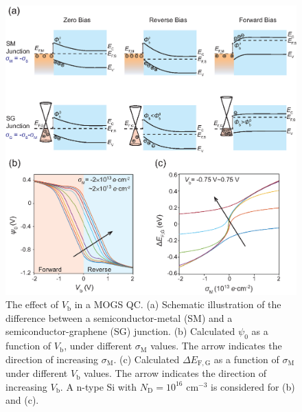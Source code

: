 \documentclass[journal=nalefd]{achemso}
\newcommand*\subs[1]{_{\text{#1}}} %
\begin{document}
\begin{figure}[htbp]
  \centering
  \includegraphics[width=0.95\linewidth]{img/FIG6.eps} %
  \caption{
  The effect of $V\subs{b}$ in a MOGS QC. (a) Schematic illustration of the difference between a semiconductor-metal (SM) and a semiconductor-graphene (SG) junction.
  (b) Calculated $\psi_0$ as a function of $V\subs{b}$, under different $\sigma\subs{M}$ values. The  arrow indicates  the  direction  of increasing $\sigma\subs{M}$.
  (c) Calculated $\Delta E_{\mathrm{F,G}}$ as a function of $\sigma\subs{M}$ under different $V\subs{b}$ values. The  arrow indicates  the  direction  of increasing $V\subs{b}$.
  A n-type Si with $N\subs{D}=10^{16}$ cm$^{-3}$ is considered for (b) and (c).
  }
  \label{fig:chara-bias}
\end{figure}
\end{document}
